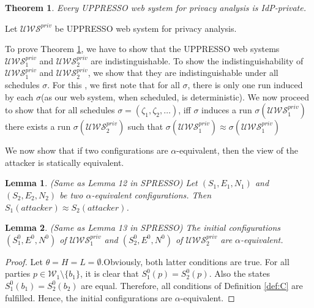 \documentclass[letterpaper,onecolumn,10pt]{article}
\newtheorem{theorem}{Theorem}
\newtheorem{lemma}{Lemma}
\begin{document}
\begin{theorem} \label{theorem:A}Every UPPRESSO web system for privacy analysis is IdP-private.
\end{theorem}

Let $\mathcal{U\!W\!S}^{priv}$ be UPPRESSO web system for privacy analysis.\par
To prove Theorem \ref{theorem:A}, we have to show that the UPPRESSO web systems $\mathcal{U\!W\!S}^{priv}_1$ and $\mathcal{U\!W\!S}^{priv}_2$ 
are indistinguishable. To show the indistinguishability of $\mathcal{U\!W\!S}^{priv}_1$ and $\mathcal{U\!W\!S}^{priv}_2$, 
we show that they are indistinguishable under all schedules $\sigma$.
For this , we first note that for all $\sigma$, there is only one run induced by each $\sigma$(as our web system, when scheduled, is deterministic).
We now proceed to show that for all schedules $\sigma=(\zeta _1, \zeta_2,\dots)$, iff $\sigma$ induces a run $\sigma(\mathcal{U\!W\!S}^{priv}_1)$ there exists a run $\sigma(\mathcal{U\!W\!S}^{priv}_2)$ such that $\sigma(\mathcal{U\!W\!S}^{priv}_1)\approx\sigma(\mathcal{U\!W\!S}^{priv}_1)$\par
We now show that if two configurations are $\alpha$-equivalent, then the view of the attacker is statically equivalent.

\begin{lemma}
  (Same as Lemma 12 in SPRESSO) Let $(S_1,E_1,N_1)$ and $(S_2,E_2,N_2)$ be two $\alpha$-equivalent configurations. Then $S_1(attacker)\approx S_2(attacker)$.
\end{lemma}

\begin{lemma}
  (Same as Lemma 13 in SPRESSO) The initial configurations $(S_1^0,E^0,N^0)$ of $\mathcal{U\!W\!S}^{priv}_1$ and $(S_2^0,E^0,N^0)$ of $\mathcal{U\!W\!S}^{priv}_2$ are $\alpha$-equivalent.
\end{lemma}
\begin{proof}
  Let $\theta=H=L=\emptyset$.Obviously, both latter conditions are true. For all parties $p\in\mathcal{W}_1\setminus\{b_1\}$, it is clear that $S^0_1(p)=S^0_2(p)$.
  Also the states $S^0_1(b_1)=S^0_2(b_2)$ are equal. Therefore, all conditions of Definition \ref{def:C} are fulfilled. Hence, the  initial configurations are $\alpha$-equivalent.
\end{proof}
\end{document}
